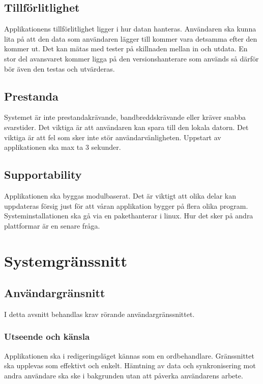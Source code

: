 \subsection{Tillförlitlighet} 
Applikationens tillförlitlighet ligger i hur datan hanteras. Användaren ska kunna lita på att den data som användaren lägger till kommer vara detsamma efter den kommer ut. Det kan mätas med tester på skillnaden mellan in och utdata. En stor del avansvaret kommer ligga på den versionshanterare som används så därför bör även den testas och utvärderas.

\subsection{Prestanda}
Systemet är inte prestandakrävande, bandbreddskrävande eller kräver snabba svarstider. Det viktiga är att användaren kan spara till den lokala datorn. Det viktiga är att fel som sker inte stör användarvänligheten. Uppstart av applikationen ska max ta 3 sekunder.

\subsection{Supportability} %
Applikationen ska byggas modulbaserat. Det är viktigt att olika delar kan uppdateras försig just för att våran applikation bygger på flera olika program. Systeminstallationen ska gå via en pakethanterar i linux.  Hur det sker på andra plattformar är en senare fråga.


\section{Systemgränssnitt}

\subsection{Användargränsnitt}

I detta avsnitt behandlas krav rörande användargränssnittet.

\subsubsection{Utseende och känsla}
Applikationen ska i redigeringsläget kännas som en ordbehandlare. Gränssnittet ska upplevas som effektivt och enkelt. Hämtning av data och synkronisering mot andra användare ska ske i bakgrunden utan att påverka användarens arbete.

